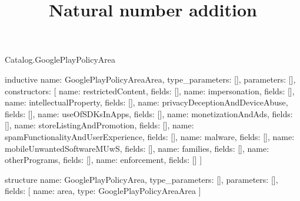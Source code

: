 \begin{lexlean}{Catalog.GooglePlayPolicyArea}
\title{Natural number addition}
\begin{semanticmodule}
inductive{
  name: GooglePlayPolicyAreaArea,
  type_parameters: [],
  parameters: [],
  constructors: [
    {name: restrictedContent, fields: []},
    {name: impersonation, fields: []},
    {name: intellectualProperty, fields: []},
    {name: privacyDeceptionAndDeviceAbuse, fields: []},
    {name: useOfSDKsInApps, fields: []},
    {name: monetizationAndAds, fields: []},
    {name: storeListingAndPromotion, fields: []},
    {name: spamFunctionalityAndUserExperience, fields: []},
    {name: malware, fields: []},
    {name: mobileUnwantedSoftwareMUwS, fields: []},
    {name: families, fields: []},
    {name: otherPrograms, fields: []},
    {name: enforcement, fields: []}
  ]
}

structure{
  name: GooglePlayPolicyArea,
  type_parameters: [],
  parameters: [],
  fields: [
    {name: area, type: GooglePlayPolicyAreaArea}
  ]
}
\end{semanticmodule}
\end{lexlean}
